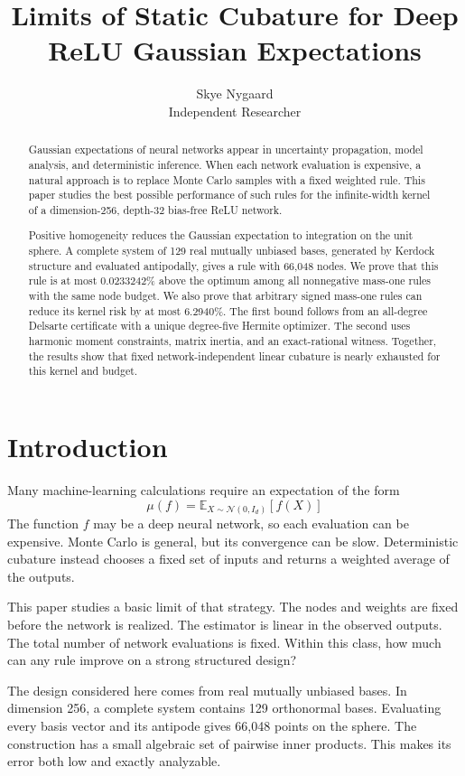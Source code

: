 \documentclass[11pt]{article}
\title{Limits of Static Cubature for Deep ReLU Gaussian Expectations}
\author{Skye Nygaard\\\small Independent Researcher}
\date{}
\begin{document}
\maketitle
\begin{abstract}
Gaussian expectations of neural networks appear in uncertainty
propagation, model analysis, and deterministic inference. When each
network evaluation is expensive, a natural approach is to replace Monte
Carlo samples with a fixed weighted rule. This paper studies the best
possible performance of such rules for the infinite-width kernel of a
dimension-256, depth-32 bias-free ReLU network.

Positive homogeneity reduces the Gaussian expectation to integration on
the unit sphere. A complete system of 129 real mutually unbiased bases,
generated by Kerdock structure and evaluated antipodally, gives a rule
with 66,048 nodes. We prove that this rule is at most 0.0233242\% above
the optimum among all nonnegative mass-one rules with the same node
budget. We also prove that arbitrary signed mass-one rules can reduce
its kernel risk by at most 6.2940\%. The first bound follows from an
all-degree Delsarte certificate with a unique degree-five Hermite
optimizer. The second uses harmonic moment constraints, matrix inertia,
and an exact-rational witness. Together, the results show that fixed
network-independent linear cubature is nearly exhausted for this kernel
and budget.
\end{abstract}

\section{Introduction}\label{introduction}

Many machine-learning calculations require an expectation of the form \[
\mu(f)=\mathbb{E}_{X\sim\mathcal{N}(0,I_d)}[f(X)]
\] The function \(f\) may be a deep neural network, so each evaluation
can be expensive. Monte Carlo is general, but its convergence can be
slow. Deterministic cubature instead chooses a fixed set of inputs and
returns a weighted average of the outputs.

This paper studies a basic limit of that strategy. The nodes and weights
are fixed before the network is realized. The estimator is linear in the
observed outputs. The total number of network evaluations is fixed.
Within this class, how much can any rule improve on a strong structured
design?

The design considered here comes from real mutually unbiased bases. In
dimension 256, a complete system contains 129 orthonormal bases.
Evaluating every basis vector and its antipode gives 66,048 points on
the sphere. The construction has a small algebraic set of pairwise inner
products. This makes its error both low and exactly analyzable.
\end{document}

